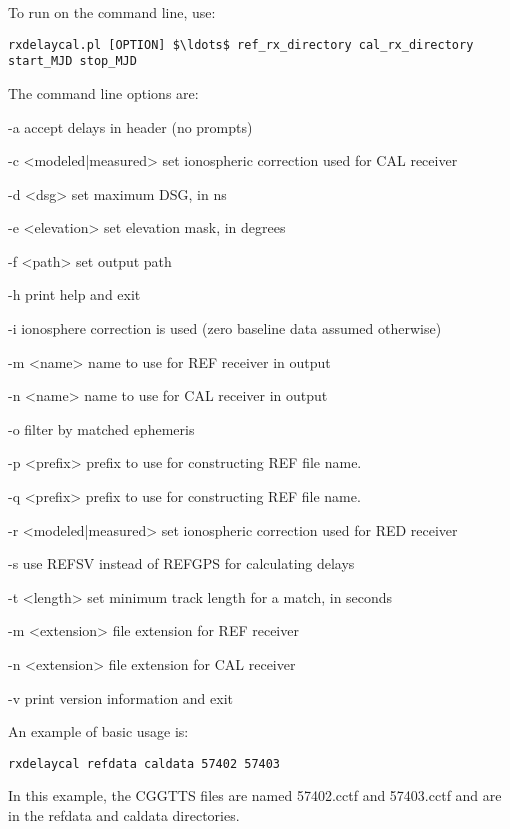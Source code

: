 To run  on the command line, use:
\begin{lstlisting}[mathescape=true]
rxdelaycal.pl [OPTION] $\ldots$ ref_rx_directory cal_rx_directory start_MJD stop_MJD
\end{lstlisting}
The command line options are:
\begin{description*}
	\item[-a]	accept delays in header (no prompts)
	\item[-c  \textless modeled|measured\textgreater] set ionospheric correction used for CAL receiver
	\item[-d  \textless dsg\textgreater] set maximum DSG, in ns
	\item[-e  \textless elevation\textgreater] set elevation mask, in degrees
	\item[-f  \textless path\textgreater] set output path
	\item[-h]	print help and exit
	\item[-i] ionosphere correction is used (zero baseline data assumed otherwise)
	\item[-m  \textless name\textgreater] name to use for REF receiver in output
	\item[-n  \textless name\textgreater] name to use for CAL receiver in output
	\item[-o] filter by matched ephemeris
	\item[-p \textless prefix\textgreater] prefix to use for constructing REF file name.
	\item[-q \textless prefix\textgreater] prefix to use for constructing REF file name.
	\item[-r  \textless modeled|measured\textgreater] set ionospheric correction used for RED receiver
	\item[-s]  use REFSV instead of REFGPS for calculating delays
	\item[-t  \textless length\textgreater] set minimum track length for a match, in seconds
	\item[-m  \textless extension\textgreater] file extension for REF receiver
	\item[-n  \textless extension\textgreater] file extension for CAL receiver
	\item[-v]	print version information and exit
\end{description*}

An example of basic usage is:
\begin{lstlisting}
rxdelaycal refdata caldata 57402 57403
\end{lstlisting}
In this example, the CGGTTS files are named 57402.cctf and 57403.cctf and are in the refdata and caldata directories.

